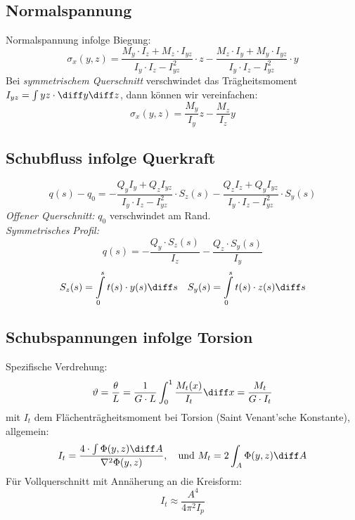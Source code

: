 	\subsection{Normalspannung} %
		Normalspannung infolge Biegung:
		\begin{equation*}
			\sigma_x(y,z) = \frac{M_y\cdot I_z + M_z \cdot I_{yz}}{I_y\cdot I_z - I_{yz}^2}\cdot z - \frac{M_z \cdot I_y + M_y \cdot I_{yz}}{I_y \cdot I_z - I_{yz}^2}\cdot y
		\end{equation*}
		Bei \emph{symmetrischem Querschnitt} verschwindet das Träg\-heits\-moment $I_{yz}= \int yz \cdot \diff y\diff z$, dann können wir vereinfachen:
		\begin{equation*}
			\sigma_x(y,z) = \frac{M_y}{I_y}z - \frac{M_z}{I_z}y
		\end{equation*}
		\subsection{Schubfluss infolge Querkraft}\label{schubflussquerkraft}
		\begin{equation*}
			q(s) - q_0 = -\frac{Q_y I_y + Q_z I_{yz}}{I_y \cdot I_z - I_{yz}^2}\cdot S_z(s) - \frac{Q_z I_z + Q_y I_{yz}}{I_y \cdot I_z - I_{yz}^2}\cdot S_y(s)
		\end{equation*}
		\emph{Offener Querschnitt:} $q_0$ verschwindet am Rand. \\
		\emph{Symmetrisches Profil:}
		\begin{equation*}
			q(s) = -\frac{Q_y \cdot S_z(s)}{I_z}-\frac{Q_z \cdot S_y(s)}{I_y}
		\end{equation*}
		\begin{equation*}
			S_z(s) = \int\limits_0^s t(s)\cdot y(s) \diff s \quad S_y(s) = \int\limits_0^s t(s)\cdot z(s) \diff s
		\end{equation*}
	\subsection{Schubspannungen infolge Torsion} %
		Spezifische Verdrehung:
		\begin{equation*}
			\vartheta = \frac{\theta}{L}= \frac{1}{G \cdot L} \int_0^1 \frac{M_t(x)}{I_t}\diff x = \frac{M_t}{G \cdot I_t}
		\end{equation*}
		mit $I_t$ dem Flächenträgheitsmoment bei Torsion (Saint Venant'sche Konstante), allgemein:
		\begin{equation*}
			I_t = \frac{4 \cdot \int \Phi(y,z) \diff A}{\nabla^2 \Phi(y,z)}, \quad \text{und } M_t = 2 \int_A \Phi(y,z) \diff A
		\end{equation*}
		Für Vollquerschnitt mit Annäherung an die Kreisform:
		\begin{equation*}
			I_t \approx \frac{A^4}{4\pi^2I_p}
		\end{equation*}
